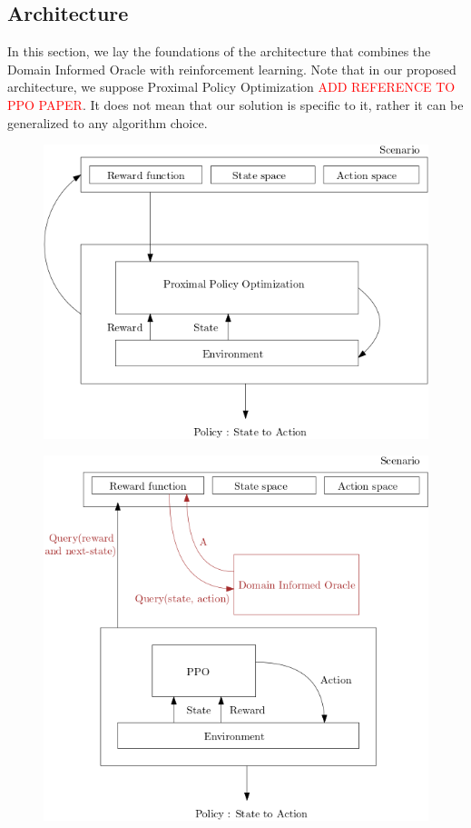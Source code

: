 \subsection{Architecture}
In this section, we lay the foundations of the architecture that combines the Domain Informed Oracle with 
reinforcement learning. Note that in our proposed architecture, we suppose Proximal Policy Optimization \textcolor{red}{ADD REFERENCE TO PPO PAPER}. 
It does not mean that our solution is specific to it, rather it can be generalized to any algorithm choice.

\begin{figure}[H]
  \centering
  \begin{minipage}{.5\textwidth}
    \centering
    \includegraphics[width=1\linewidth]{figures/basicrl.png}
    \label{fig:basicrl}
  \end{minipage}%
  \begin{minipage}{.45\textwidth}
    \centering
    \includegraphics[width=1\linewidth]{figures/dio.png}

\end{minipage}
\end{figure}
